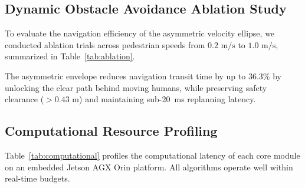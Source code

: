 \documentclass[journal]{IEEEtran}
\begin{document}
\subsection{Dynamic Obstacle Avoidance Ablation Study}
To evaluate the navigation efficiency of the asymmetric velocity ellipse, we conducted ablation trials across pedestrian speeds from $0.2\text{ m/s}$ to $1.0\text{ m/s}$, summarized in Table~\ref{tab:ablation}.

\begin{table}[!h]
\caption{Dynamic Obstacle Traversal and Replanning Ablation Study}
\label{tab:ablation}
\centering
{}
\end{table}

The asymmetric envelope reduces navigation transit time by up to \textbf{$36.3\%$} by unlocking the clear path behind moving humans, while preserving safety clearance ($>0.43\text{ m}$) and maintaining sub-20~ms replanning latency.

\subsection{Computational Resource Profiling}
Table~\ref{tab:computational} profiles the computational latency of each core module on an embedded Jetson AGX Orin platform. All algorithms operate well within real-time budgets.

\begin{table}[!h]
\caption{Computational Profiling on Embedded Hardware}
\label{tab:computational}
\centering
{}
\end{table}
\end{document}
